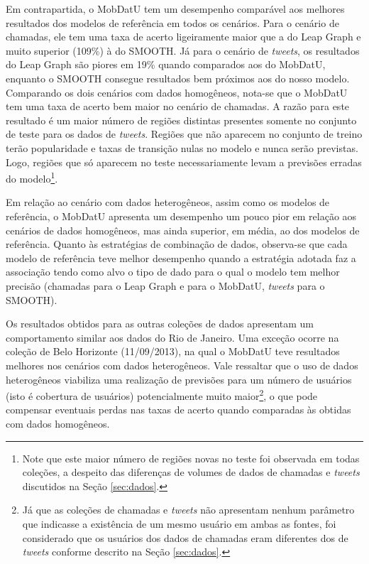 \documentclass[10pt, a4paper, onecolumn, conference, compsocconf]{IEEEtran}
\begin{document}
Em contrapartida, o MobDatU tem um desempenho comparável aos melhores resultados dos modelos de referência em todos os cenários. Para o cenário de chamadas, ele tem uma taxa de acerto ligeiramente maior que a do Leap Graph e muito superior (109\%) à do SMOOTH. Já para o cenário de \textit{tweets}, os resultados do Leap Graph são piores em 19\% quando comparados aos do MobDatU, enquanto o SMOOTH consegue resultados bem próximos aos do nosso modelo. Comparando os dois cenários com dados homogêneos, nota-se que o MobDatU tem uma taxa de acerto bem maior  no cenário de chamadas. A razão para este resultado é um maior número de regiões distintas presentes somente no conjunto de teste para os dados de {\it tweets}. Regiões que não aparecem no conjunto de treino terão popularidade e taxas de transição nulas no modelo e nunca serão previstas. Logo, regiões que só aparecem no teste necessariamente levam a previsões erradas do modelo\footnote{ Note que este maior número de regiões novas no teste foi observada em todas coleções, a despeito das diferenças de volumes de dados de chamadas e {\it tweets} discutidos na Seção \ref{sec:dados}.}.

Em relação ao cenário com dados heterogêneos, assim como os modelos de referência, o MobDatU apresenta um desempenho um pouco pior em relação aos cenários de dados homogêneos, mas ainda superior, em média, ao dos modelos de referência.
Quanto às  estratégias de combinação de dados, observa-se que cada  modelo de referência teve melhor desempenho quando a estratégia adotada faz a associação tendo como alvo o tipo de dado para o qual o modelo tem melhor precisão (chamadas para o Leap Graph e para o MobDatU, {\it tweets} para o SMOOTH).  

Os resultados obtidos para as outras coleções de dados apresentam um comportamento similar aos dados do Rio de Janeiro. Uma exceção ocorre na coleção de Belo Horizonte (11/09/2013), na qual   o MobDatU  teve resultados melhores nos cenários com dados heterogêneos. 
Vale ressaltar que o uso de dados heterogêneos viabiliza uma realização de previsões para um número  de usuários (isto é cobertura de usuários) potencialmente muito maior\footnote{Já que as coleções de chamadas e \textit{tweets} não apresentam nenhum parâmetro que indicasse a existência de um mesmo usuário em ambas as fontes, foi considerado que os usuários dos dados de chamadas eram diferentes dos de \textit{tweets} conforme descrito na Seção \ref{sec:dados}.}, o que pode compensar eventuais perdas nas taxas de acerto quando comparadas às obtidas  com dados homogêneos.
\end{document}
